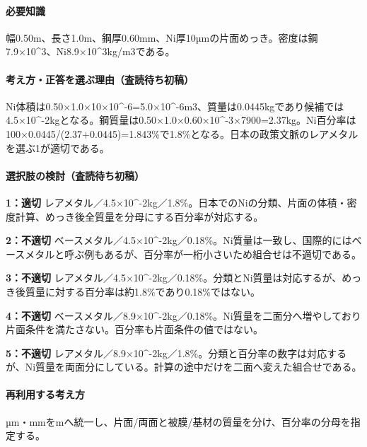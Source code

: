 \paragraph{必要知識} 幅0.50m、長さ1.0m、鋼厚0.60mm、Ni厚10µmの片面めっき。密度は鋼7.9×10\textasciicircum{}3、Ni8.9×10\textasciicircum{}3kg/m3である。

\paragraph{考え方・正答を選ぶ理由（査読待ち初稿）} Ni体積は0.50×1.0×10×10\textasciicircum{}-6=\allowbreak{}5.0×10\textasciicircum{}-6m3、質量は0.0445kgであり候補では4.5×10\textasciicircum{}-2kgとなる。鋼質量は0.50×1.0×0.60×10\textasciicircum{}-3×7900=\allowbreak{}2.37kg。Ni百分率は100×0.0445/(2.37+0.0445)=\allowbreak{}1.843\%で1.8\%となる。日本の政策文脈のレアメタルを選ぶ1が適切である。

\paragraph{選択肢の検討（査読待ち初稿）}\mbox{}\par

\noindent\textbf{1：適切} レアメタル／4.5×10\textasciicircum{}-2kg／1.8\%。日本でのNiの分類、片面の体積・密度計算、めっき後全質量を分母にする百分率が対応する。\par

\noindent\textbf{2：不適切} ベースメタル／4.5×10\textasciicircum{}-2kg／0.18\%。Ni質量は一致し、国際的にはベースメタルと呼ぶ例もあるが、百分率が一桁小さいため組合せは不適切である。\par

\noindent\textbf{3：不適切} レアメタル／4.5×10\textasciicircum{}-2kg／0.18\%。分類とNi質量は対応するが、めっき後質量に対する百分率は約1.8\%であり0.18\%ではない。\par

\noindent\textbf{4：不適切} ベースメタル／8.9×10\textasciicircum{}-2kg／0.18\%。Ni質量を二面分へ増やしており片面条件を満たさない。百分率も片面条件の値ではない。\par

\noindent\textbf{5：不適切} レアメタル／8.9×10\textasciicircum{}-2kg／1.8\%。分類と百分率の数字は対応するが、Ni質量を両面分にしている。計算の途中だけを二面へ変えた組合せである。\par

\paragraph{再利用する考え方} µm・mmをmへ統一し、片面/両面と被膜/基材の質量を分け、百分率の分母を指定する。

